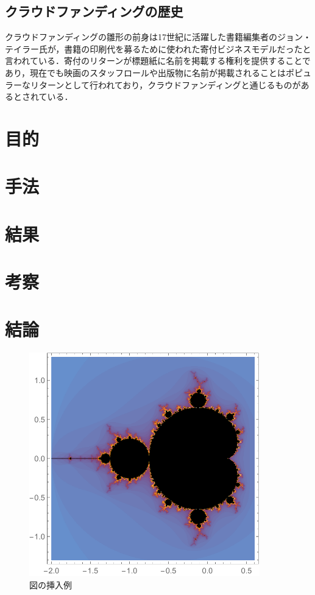 \section{クラウドファンディングの歴史}
クラウドファンディングの雛形の前身は17世紀に活躍した書籍編集者のジョン・テイラー氏が，書籍の印刷代を募るために使われた寄付ビジネスモデルだったと言われている．寄付のリターンが標題紙に名前を掲載する権利を提供することであり，現在でも映画のスタッフロールや出版物に名前が掲載されることはポピュラーなリターンとして行われており，クラウドファンディングと通じるものがあるとされている．

\chapter{目的}

\chapter{手法}

\chapter{結果}

\chapter{考察}

\chapter{結論}

\begin{figure}[htb]
\centering
\includegraphics[width=10cm]{figure.pdf}
\caption{図の挿入例}\label{サンプル図}
\end{figure}

